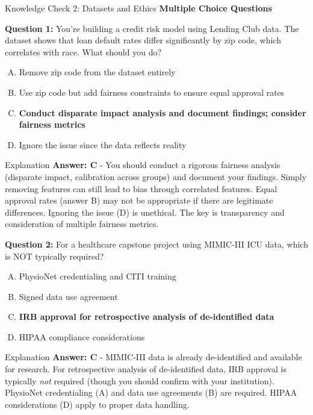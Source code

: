 \begin{frame}{Knowledge Check 2: Datasets and Ethics}
\textbf{Multiple Choice Questions}

\vspace{0.3cm}

\textbf{Question 1:} You're building a credit risk model using Lending Club data. The dataset shows that loan default rates differ significantly by zip code, which correlates with race. What should you do?

\begin{enumerate}[A)]
\item Remove zip code from the dataset entirely
\item Use zip code but add fairness constraints to ensure equal approval rates
\item \textcolor{forest}{\textbf{Conduct disparate impact analysis and document findings; consider fairness metrics}}
\item Ignore the issue since the data reflects reality
\end{enumerate}

\pause

\begin{block}{Explanation}
\textcolor{forest}{\textbf{Answer: C}} - You should conduct a rigorous fairness analysis (disparate impact, calibration across groups) and document your findings. Simply removing features can still lead to bias through correlated features. Equal approval rates (answer B) may not be appropriate if there are legitimate differences. Ignoring the issue (D) is unethical. The key is transparency and consideration of multiple fairness metrics.
\end{block}

\pause

\vspace{0.2cm}

\textbf{Question 2:} For a healthcare capstone project using MIMIC-III ICU data, which is NOT typically required?

\begin{enumerate}[A)]
\item PhysioNet credentialing and CITI training
\item Signed data use agreement
\item \textcolor{forest}{\textbf{IRB approval for retrospective analysis of de-identified data}}
\item HIPAA compliance considerations
\end{enumerate}

\pause

\begin{block}{Explanation}
\textcolor{forest}{\textbf{Answer: C}} - MIMIC-III data is already de-identified and available for research. For retrospective analysis of de-identified data, IRB approval is typically \textit{not} required (though you should confirm with your institution). PhysioNet credentialing (A) and data use agreements (B) are required. HIPAA considerations (D) apply to proper data handling.
\end{block}
\end{frame}

